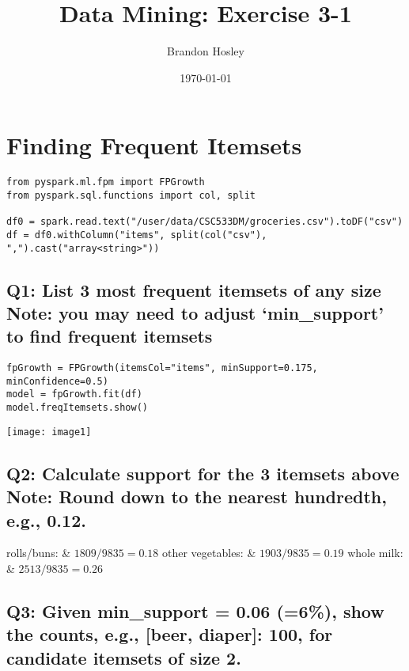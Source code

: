 \documentclass[]{article}
\title{Data Mining: Exercise 3-1}
\author{Brandon Hosley}
\date{\today}
\begin{document}
\maketitle

\section*{Finding Frequent Itemsets}

\begin{verbatim}
from pyspark.ml.fpm import FPGrowth
from pyspark.sql.functions import col, split

df0 = spark.read.text("/user/data/CSC533DM/groceries.csv").toDF("csv")
df = df0.withColumn("items", split(col("csv"), ",").cast("array<string>"))
\end{verbatim}

\subsection*{Q1: List 3 most frequent itemsets of any size \\ Note: you may need to adjust ‘min\_support’ to find frequent itemsets}

\begin{verbatim}
fpGrowth = FPGrowth(itemsCol="items", minSupport=0.175, minConfidence=0.5)
model = fpGrowth.fit(df)
model.freqItemsets.show()
\end{verbatim}

\texttt{[image: image1]}

\subsection*{Q2: Calculate support for the 3 itemsets above \\ Note: Round down to the nearest hundredth, e.g., 0.12.}

\begin{tabular}
	rolls/buns:		& $ 1809 / 9835 = 0.18 $
	other vegetables: & $ 1903 / 9835 = 0.19 $
	whole milk:		& $ 2513 / 9835 = 0.26 $
\end{tabular}

\subsection*{Q3: Given min\_support = 0.06 (=6\%), show the counts, e.g., [beer, diaper]: 100, for candidate itemsets of size 2. }
\end{document}
